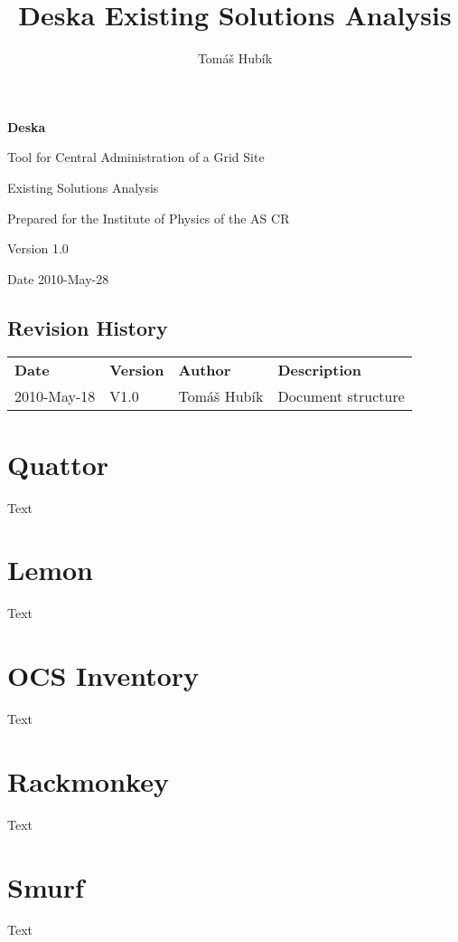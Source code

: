 \documentclass[12pt]{article}
\author{Tomáš Hubík}
\title{Deska Existing Solutions Analysis}
\begin{document}
{\Huge \textbf{Deska}}

\vspace{0.2in}

{\large Tool for Central Administration of a Grid Site}

\vspace{0.5in}

{\large Existing Solutions Analysis}

\vspace{0.2in}

{\large Prepared for the Institute of Physics of the AS CR}

\vspace{0.2in}

{\large Version 1.0}

\vspace{0.2in}

{\large Date 2010-May-28}

\vspace{0.5in}

\subsection*{Revision History}

\begin{table}[!h]
	\begin{tabular}{l l l l}
		\textbf{Date} & \textbf{Version} & \textbf{Author} & \textbf{Description} \\
		2010-May-18 & V1.0 & Tomáš Hubík & Document structure \\ 
	\end{tabular}
	\label{tab:RevisionHistory}
\end{table}

\newpage

\tableofcontents

\newpage


\section{Quattor}
Text

\section{Lemon}
Text

\section{OCS Inventory}
Text

\section{Rackmonkey}
Text

\section{Smurf}
Text
\end{document}

